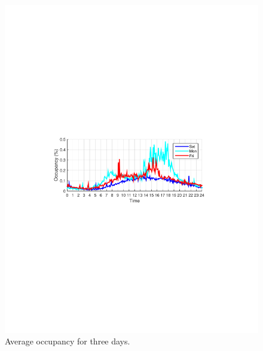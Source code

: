 \documentclass[twocolumn,10pt]{asme2e}
\begin{document}
\begin{figure}[h]
	\centering
	\includegraphics[width=0.7\linewidth]{./Figures/occ1}
	\caption{Average occupancy for three days.}
	\label{fig:occ1}
\end{figure} 
\end{document}
